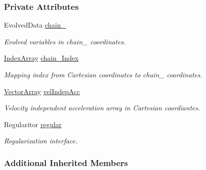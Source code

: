 \subsubsection*{Private Attributes}
\begin{DoxyCompactItemize}
\item 
Evolved\+Data \mbox{\hyperlink{class_a_rchain_3_01_newtonian_3_01typename_01_evolved_data_1_1_scalar_01_4_00_01_evolved_data_00_01_regularitor_01_4_a39576accb53257bdb1b55e6d21acdf0f}{chain_}}
\begin{DoxyCompactList}\small\item\em Evolved variables in chain_ coordinates. \end{DoxyCompactList}\item
\mbox{\hyperlink{class_a_rchain_3_01_newtonian_3_01typename_01_evolved_data_1_1_scalar_01_4_00_01_evolved_data_00_01_regularitor_01_4_a0072f8585c3e6ba8d64cb81be90fb376}{Index\+Array}} \mbox{\hyperlink{class_a_rchain_3_01_newtonian_3_01typename_01_evolved_data_1_1_scalar_01_4_00_01_evolved_data_00_01_regularitor_01_4_a6a8ef156105e2f80dc143606d4ba10c9}{chain_\+Index}}
\begin{DoxyCompactList}\small\item\em Mapping index from Cartesian coordinates to chain_ coordinates. \end{DoxyCompactList}\item
\mbox{\hyperlink{class_a_rchain_3_01_newtonian_3_01typename_01_evolved_data_1_1_scalar_01_4_00_01_evolved_data_00_01_regularitor_01_4_a1ff7d2e64f488df9edae2ad796945bbd}{Vector\+Array}} \mbox{\hyperlink{class_a_rchain_3_01_newtonian_3_01typename_01_evolved_data_1_1_scalar_01_4_00_01_evolved_data_00_01_regularitor_01_4_af0862cdda12b7ba2ba5d5d098d008398}{vel\+Indep\+Acc}}
\begin{DoxyCompactList}\small\item\em Velocity independent acceleration array in Cartesian coordiantes. \end{DoxyCompactList}\item 
Regularitor \mbox{\hyperlink{class_a_rchain_3_01_newtonian_3_01typename_01_evolved_data_1_1_scalar_01_4_00_01_evolved_data_00_01_regularitor_01_4_a6e5a31aa07620ab9f3503ebc412ff969}{regular}}
\begin{DoxyCompactList}\small\item\em Regularization interface. \end{DoxyCompactList}\end{DoxyCompactItemize}
\subsubsection*{Additional Inherited Members}


